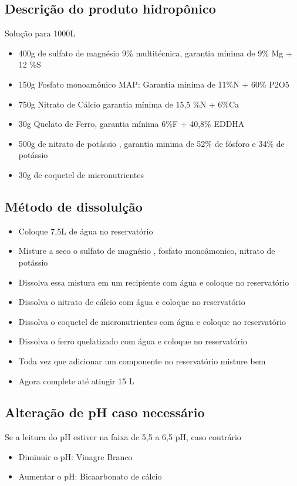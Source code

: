 \subsection{Descrição do produto hidropônico}
Solução para 1000L
\begin{itemize}
	\item 400g de sulfato de magnésio 9\%  multitécnica, garantia mínima de 9\% Mg + 12 \%S
	\item 150g Fosfato monoamônico MAP: Garantia minima de 11\%N + 60\% P2O5
	\item 750g Nitrato de Cálcio garantia mínima de 15,5 \%N + 6\%Ca
	\item 30g Quelato de Ferro, garantia mínima 6\%F + 40,8\% EDDHA
	\item 500g de nitrato de potássio , garantia minima de 52\% de fósforo e 34\% de potássio
	\item 30g de coquetel de micronutrientes 
\end{itemize}

\subsection{Método de dissolulção}

\begin{itemize}
	\item Coloque 7,5L de água no reservatório
	\item Misture a seco o sulfato de magnésio , fosfato monoâmonico, nitrato de potássio
	\item Dissolva essa mistura em um recipiente com água e coloque no reservatório
	\item Dissolva o nitrato de cálcio com água e coloque no reservatório
	\item Dissolva o coquetel de micronutrientes  com água e coloque no reservatório
	\item  Dissolva o ferro quelatizado com água e coloque no reservatório
	\item Toda vez que adicionar um componente no reservatório misture bem
	\item Agora complete até atingir 15 L
\end{itemize}
\subsection{Alteração de pH caso necessário}

Se a leitura do pH estiver na faixa de 5,5 a 6,5 pH, caso contrário

\begin{itemize}
	\item Diminuir o pH: Vinagre Branco
	\item Aumentar o pH: Bicaarbonato de cálcio
\end{itemize}

